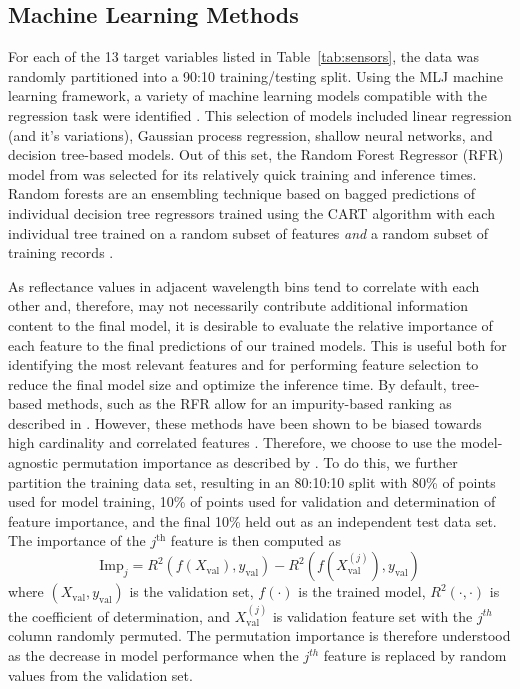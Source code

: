 \documentclass[remotesensing,article,submit,pdftex,moreauthors]{Definitions/mdpi}
\begin{document}
\subsection{Machine Learning Methods}

For each of the 13 target variables listed in Table~\ref{tab:sensors}, the data was randomly partitioned into a 90:10 training/testing split. Using the MLJ machine learning framework, a variety of machine learning models compatible with the regression task were identified \cite{MLJ1}. This selection of models included linear regression (and it's variations), Gaussian process regression, shallow neural networks, and decision tree-based models. Out of this set, the Random Forest Regressor (RFR) model from \cite{decision-trees} was selected for its relatively quick training and inference times. Random forests are an ensembling technique based on bagged predictions of individual decision tree regressors trained using the CART algorithm with each individual tree trained on a random subset of features \textit{and} a random subset of training records \cite{decision-trees, random-forest}.

As reflectance values in adjacent wavelength bins tend to correlate with each other and, therefore, may not necessarily contribute additional information content to the final model, it is desirable to evaluate the relative importance of each feature to the final predictions of our trained models. This is useful both for identifying the most relevant features and for performing feature selection to reduce the final model size and optimize the inference time. By default, tree-based methods, such as the RFR allow for an impurity-based ranking as described in \cite{random-forest, rfr-importance-ranking}. However, these methods have been shown to be biased towards high cardinality and correlated features \cite{strobl2008conditional}. Therefore, we choose to use the model-agnostic permutation importance as described by \cite{parr2018beware}. To do this, we further partition the training data set, resulting in an 80:10:10 split with 80\% of points used for model training, 10\% of points used for validation and determination of feature importance, and the final 10\% held out as an independent test data set. The importance of the $j^{\text{th}}$ feature is then computed as
\begin{equation}
    \text{Imp}_j = R^2(f(X_{\text{val}}), y_{\text{val}}) - R^2(f(X_{\text{val}}^{(j)}), y_{\text{val}})
\end{equation}
where $(X_{\text{val}}, y_{\text{val}})$ is the validation set, $f(\cdot)$ is the trained model, $R^2(\cdot, \cdot)$ is the coefficient of determination, and $X_{\text{val}}^{(j)}$ is validation feature set with the $j^{th}$ column randomly permuted. The permutation importance is therefore understood as the decrease in model performance when the $j^{th}$ feature is replaced by random values from the validation set.
\end{document}
